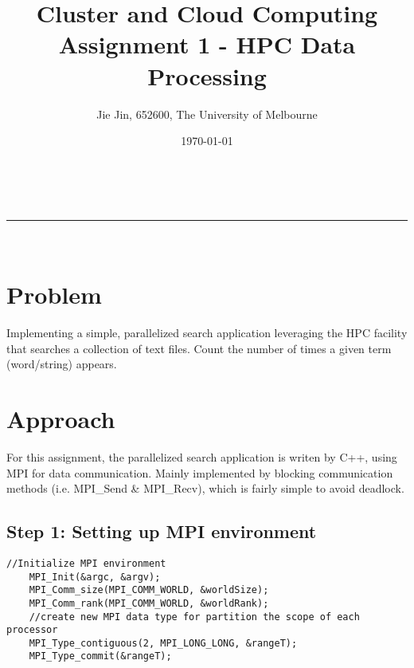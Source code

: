 \documentclass[a4paper,12pt]{article}
\makeatletter
\newcommand{\linia}{\rule{\linewidth}{0.5pt}}
\theoremstyle{mytheor}
\renewcommand{\maketitle}{
\begin{center}
\vspace{2ex}
{\huge \textsc{\@title}}
\vspace{1ex}
\\
\linia\\
\@author \hfill \@date
\vspace{4ex}
\end{center}
}
\makeatother
\begin{document}
\renewcommand\lstlistingname{Snippet}
\renewcommand\lstlistlistingname{Snippet}
\title{\textbf{Cluster and Cloud Computing\\ Assignment 1 -
HPC Data Processing}}

\author{Jie Jin, 652600, The University of Melbourne}

\date{\today}

\maketitle

\section*{Problem}

Implementing a simple, parallelized search application leveraging the HPC facility that searches a collection of text files. Count the number of times a given term (word/string) appears.


\section*{Approach}
For this assignment, the parallelized search application is writen by C++, using MPI for data communication. Mainly implemented by blocking communication methods (i.e. MPI\_Send \& MPI\_Recv), which is fairly simple to avoid deadlock. 

\subsection*{Step 1: Setting up MPI environment}

\begin{lstlisting}[label={list:first},caption=Data type for file offsets.]
	//Initialize MPI environment
	MPI_Init(&argc, &argv);
	MPI_Comm_size(MPI_COMM_WORLD, &worldSize);
	MPI_Comm_rank(MPI_COMM_WORLD, &worldRank);
	//create new MPI data type for partition the scope of each processor
	MPI_Type_contiguous(2, MPI_LONG_LONG, &rangeT);
	MPI_Type_commit(&rangeT);
\end{lstlisting}
\end{document}
